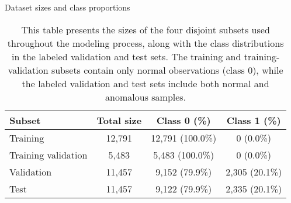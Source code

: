 \begin{table}[!t]
    \centering
    \caption{Dataset sizes and class proportions}
    \label{tab:data-split}
    \begin{tabular}{lccc}
    \toprule
    \textbf{Subset} & \textbf{Total size} & \textbf{Class 0 (\%)} & \textbf{Class 1 (\%)} \\
    \midrule
    Training              & 12,791 & 12,791 (100.0\%) & 0 (0.0\%) \\
    Training validation   & 5,483  & 5,483 (100.0\%) & 0 (0.0\%) \\
    Validation  & 11,457 & 9,152 (79.9\%)  & 2,305 (20.1\%) \\
    Test        & 11,457 & 9,122 (79.9\%)  & 2,335 (20.1\%) \\
    \bottomrule
    \end{tabular}
    \vspace{2mm}
    \caption*{\footnotesize This table presents the sizes of the four disjoint subsets used throughout the modeling process, along with the class distributions in the labeled validation and test sets. The training and training-validation subsets contain only normal observations (class 0), while the labeled validation and test sets include both normal and anomalous samples.}
\end{table}